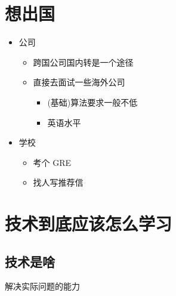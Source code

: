 \documentclass[11pt,a4paper]{article}
\begin{document}
\section{想出国}
\label{sec:org14771db}
\begin{itemize}
\item 公司
\begin{itemize}
\item 跨国公司国内转是一个途径
\item 直接去面试一些海外公司
\begin{itemize}
\item (基础)算法要求一般不低
\item 英语水平
\end{itemize}
\end{itemize}
\item 学校
\begin{itemize}
\item 考个 GRE
\item 找人写推荐信
\end{itemize}
\end{itemize}

\section{技术到底应该怎么学习}
\label{sec:orgf15f074}
\subsection{技术是啥}
\label{sec:org97d26c8}
解决实际问题的能力
\end{document}
